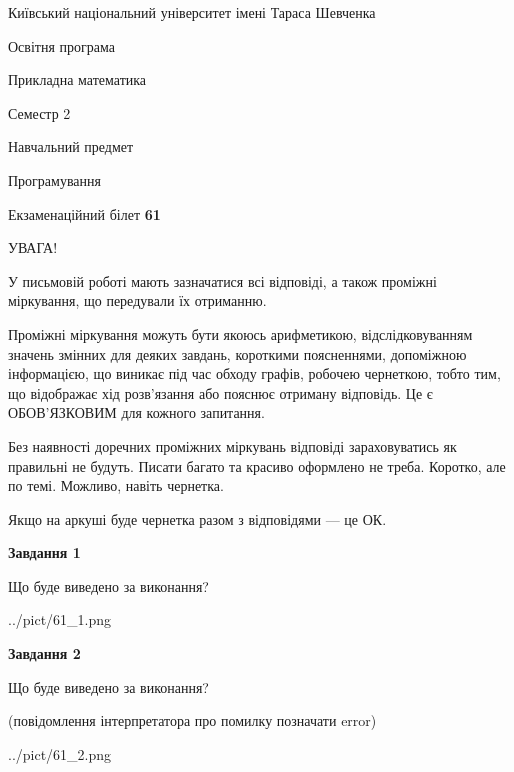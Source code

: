 \documentclass[12pt, ukrainian]{article}
\begin{document}
{{\begin {small}\par
{ \center  Київський національний університет імені Тараса Шевченка \par}
{\parbox {5 cm}{Освітня програма \hfill}{\parbox {7 cm}{Прикладна математика\hfill}}\parbox {6 cm}{\hfill Семестр 2}}\par
{\parbox {5 cm} {Навчальний предмет \hfill}\parbox {7 cm}{Програмування \hfill}\parbox {6cm}{\hfill}\par}\vspace{-7pt} \end{small}}{\center Екзаменаційний білет \No \textbf
{ 61 }\par}}
{
\begin {large}
УВАГА!

У письмовій роботі мають зазначатися всі відповіді, а також проміжні міркування, що передували їх отриманню.

Проміжні міркування можуть бути якоюсь арифметикою, відслідковуванням зна\-чень змінних для деяких завдань,
короткими поясненнями, допоміжною інформацією, що виникає під час обходу графів, робочею чернеткою,
тобто тим, що відображає хід розв’язання або пояснює отриману відповідь.
Це є ОБОВ’ЯЗКОВИМ для кожного запитання.

Без наявності доречних проміжних міркувань відповіді зараховуватись як правиль\-ні не будуть.
Писати багато та красиво оформлено не треба. Коротко, але по темі. Можли\-во, навіть чернетка.

Якщо на аркуші буде чернетка разом з відповідями --- це ОК.

\newpage

{\begin {center}\textbf{Завдання 1}\end {center}}\par
Що буде виведено за виконання?\par
\begin{center}
	{../pict/61_1.png}
\end{center}
\newpage

{\begin {center}\textbf{Завдання 2}\end {center}}\par
Що буде виведено за виконання?\par
 (повідомлення інтерпретатора про помилку позначати error)\par
\begin{center}
	{../pict/61_2.png}
\end{center}
\newpage


\end{large}}
\end{document}
